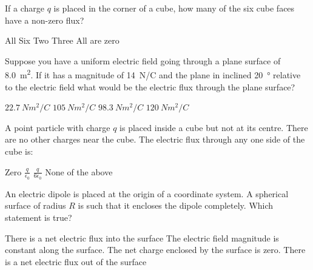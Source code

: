 \question If a charge $q$ is placed in the corner of a cube, how many of the six cube faces have a non-zero flux?
\begin{checkboxes}
\choice All Six
\choice Two
\CorrectChoice Three \correct
\choice All are zero
\end{checkboxes}


\question Suppose you have a uniform electric field going through a plane surface of \SI{8.0}{m^2}. If it has a magnitude of \SI{14}{N/C} and the plane in inclined \SI{20}{\degree} relative to the electric field what would be the electric flux through the plane surface?
\begin{checkboxes}
\choice $\SI{22.7}{Nm^2/C} $
\CorrectChoice $\SI{105}{Nm^2/C} $ \correct
\choice $\SI{98.3}{Nm^2/C} $
\choice $\SI{120}{Nm^2/C} $
\end{checkboxes}

\question A point particle with charge $q$ is placed inside a cube but not at its centre. There are no other charges near the cube. The electric flux through any one side of the cube is:
\begin{choices} 
\choice Zero
\choice $\frac{q}{\epsilon_0}$
\choice $\frac{q}{6\epsilon_0}$
\CorrectChoice None of the above \correct
\end{choices}

\question An electric dipole is placed at the origin of a coordinate system. A spherical surface of radius $R$ is such that it encloses the dipole completely. Which statement is true?
\begin{checkboxes}
\choice There is a net electric flux into the surface
\choice The electric field magnitude is constant along the surface.
\CorrectChoice The net charge enclosed by the surface is zero. \correct
\choice There is a net electric flux out of the surface
\end{checkboxes}

%
%
